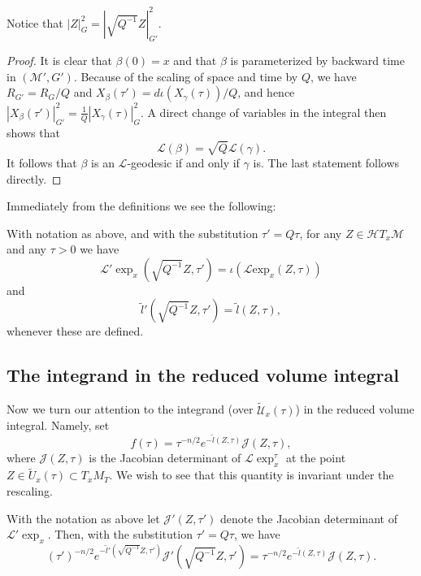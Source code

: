 \begin{remark}\label{rem:rescaling-norm-identity}

Notice that $|Z|_G^2=|\sqrt{Q^{-1}}Z|^2_{G'}$.
\end{remark}

\begin{proof}
\sketch
It is clear that $\beta(0)=x$ and that $\beta$ is parameterized by
backward time in $({\mathcal M}',G')$. Because of the scaling of
space and time by $Q$, we have $R_{G'}=R_G/Q$ and
$X_\beta(\tau')=d\iota(X_\gamma(\tau))/Q$, and hence
$|X_\beta(\tau')|^2_{G'}=\frac{1}{Q}|X_\gamma(\tau)|^2_{G}$. A
direct change of variables in the integral then shows that
$${\mathcal L}(\beta)=\sqrt{Q}{\mathcal L}(\gamma).$$
It follows that $\beta$ is an ${\mathcal L}$-geodesic if and only if
$\gamma$ is. The last statement follows directly.
\end{proof}

Immediately from the definitions we see the following:

\begin{corollary}\label{cor:l-exponential-rescaling-identity}
\label{COR}

With notation as above, and with the substitution $\tau'=Q\tau$, for
any $Z\in {\mathcal H}T_x{\mathcal M}$ and any $\tau>0$ we have
$${\mathcal
L}'\exp_x(\sqrt{Q^{-1}}Z,\tau')=\iota({\mathcal L}\mathrm{exp}_x(Z,\tau))$$ and
$$ \tilde l'(\sqrt{Q^{-1}}Z,\tau')=\tilde l(Z,\tau),$$
whenever these are defined.
\end{corollary}




\subsection{The integrand in the reduced volume integral}


Now we turn our attention to the integrand (over $\widetilde {\mathcal U}_x(\tau)$) in the
reduced volume integral. Namely, set
$$f(\tau)=\tau^{-n/2}e^{-\tilde l(Z,\tau)}{\mathcal J}(Z,\tau),$$
where ${\mathcal J}(Z,\tau)$ is the Jacobian
determinant of ${\mathcal L}\exp_x^\tau$ at the point $Z\in \widetilde
U_x(\tau)\subset T_xM_T$. We wish to see that this quantity is invariant under
the rescaling.

\begin{lemma}\label{lem:reduced-volume-integrand-scale-invariance}
\label{Qformula}

With the notation as above let ${\mathcal J}'(Z,\tau')$ denote the
Jacobian determinant of  ${\mathcal L}'\exp_x$. Then, with the
substitution $\tau'=Q\tau$, we have
$$(\tau')^{-n/2}e^{-\tilde l'(\sqrt{Q^{-1}}Z,\tau')}{\mathcal J}'(\sqrt{Q^{-1}}Z,\tau')=
\tau^{-n/2}e^{-\tilde l(Z,\tau)}{\mathcal J}(Z,\tau).$$
\end{lemma}


